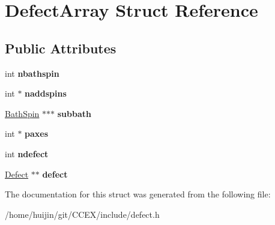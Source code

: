 \hypertarget{structDefectArray}{\section{Defect\-Array Struct Reference}
\label{structDefectArray}
}
\subsection*{Public Attributes}
\begin{DoxyCompactItemize}
\item 
\hypertarget{structDefectArray_abbe19ffc03894f576ecc2c98653c5157}{int {\bfseries nbathspin}}\label{structDefectArray_abbe19ffc03894f576ecc2c98653c5157}

\item 
\hypertarget{structDefectArray_a3a0ebca9f87b89034bd0b423c83b2773}{int $\ast$ {\bfseries naddspins}}\label{structDefectArray_a3a0ebca9f87b89034bd0b423c83b2773}

\item 
\hypertarget{structDefectArray_a36b7ddf253204964750b4e68a4b4d263}{\hyperlink{structBathSpin}{Bath\-Spin} $\ast$$\ast$$\ast$ {\bfseries subbath}}\label{structDefectArray_a36b7ddf253204964750b4e68a4b4d263}

\item 
\hypertarget{structDefectArray_a3cd9353c49e6f295684c3949911c35a9}{int $\ast$ {\bfseries paxes}}\label{structDefectArray_a3cd9353c49e6f295684c3949911c35a9}

\item 
\hypertarget{structDefectArray_a9e6a847a550580b3dc85578a0a30e1e3}{int {\bfseries ndefect}}\label{structDefectArray_a9e6a847a550580b3dc85578a0a30e1e3}

\item 
\hypertarget{structDefectArray_a32134d0ed017c082e785441cdb6a0e71}{\hyperlink{structDefect}{Defect} $\ast$$\ast$ {\bfseries defect}}\label{structDefectArray_a32134d0ed017c082e785441cdb6a0e71}

\end{DoxyCompactItemize}


The documentation for this struct was generated from the following file\-:\begin{DoxyCompactItemize}
\item 
/home/huijin/git/\-C\-C\-E\-X/include/defect.\-h\end{DoxyCompactItemize}
